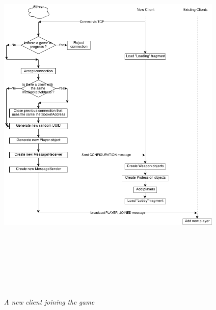 \begin{figure}
\includegraphics[height=7.665in,width=6.23in]{./images/diagrams/Client-Server.png}
\caption{\small \sl A new client joining the game
\label{fig:client_server_flow}}
\end{figure}
